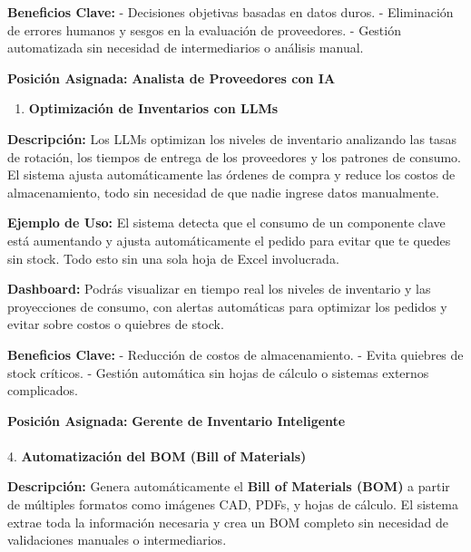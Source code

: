 \documentclass[
  10pt,
  letterpaper,
]{book}
\makeatletter
\let\oldparagraph\paragraph
\renewcommand{\paragraph}{
    \@ifstar
      \xxxParagraphStar
      \xxxParagraphNoStar
  }
\newcommand{\xxxParagraphStar}[1]{\oldparagraph*{#1}\mbox{}}
\newcommand{\xxxParagraphNoStar}[1]{\oldparagraph{#1}\mbox{}}
\providecommand{\tightlist}{%
  \setlength{\itemsep}{0pt}\setlength{\parskip}{0pt}}\usepackage{longtable,booktabs,array}
\makeatother
\begin{document}
\textbf{Beneficios Clave:} - Decisiones objetivas basadas en datos
duros. - Eliminación de errores humanos y sesgos en la evaluación de
proveedores. - Gestión automatizada sin necesidad de intermediarios o
análisis manual.

\textbf{Posición Asignada:} \textbf{Analista de Proveedores con IA}

\begin{enumerate}
\def\labelenumi{\arabic{enumi}.}
\setcounter{enumi}{2}
\tightlist
\item
  \textbf{Optimización de Inventarios con LLMs}
\end{enumerate}

\textbf{Descripción:} Los LLMs optimizan los niveles de inventario
analizando las tasas de rotación, los tiempos de entrega de los
proveedores y los patrones de consumo. El sistema ajusta automáticamente
las órdenes de compra y reduce los costos de almacenamiento, todo sin
necesidad de que nadie ingrese datos manualmente.

\textbf{Ejemplo de Uso:} El sistema detecta que el consumo de un
componente clave está aumentando y ajusta automáticamente el pedido para
evitar que te quedes sin stock. Todo esto sin una sola hoja de Excel
involucrada.

\textbf{Dashboard:} Podrás visualizar en tiempo real los niveles de
inventario y las proyecciones de consumo, con alertas automáticas para
optimizar los pedidos y evitar sobre costos o quiebres de stock.

\textbf{Beneficios Clave:} - Reducción de costos de almacenamiento. -
Evita quiebres de stock críticos. - Gestión automática sin hojas de
cálculo o sistemas externos complicados.

\textbf{Posición Asignada:} \textbf{Gerente de Inventario Inteligente}

\paragraph{\texorpdfstring{4. \textbf{Automatización del BOM (Bill of
Materials)}}{4. Automatización del BOM (Bill of Materials)}}\label{automatizaciuxf3n-del-bom-bill-of-materials}

\textbf{Descripción:} Genera automáticamente el \textbf{Bill of
Materials (BOM)} a partir de múltiples formatos como imágenes CAD, PDFs,
y hojas de cálculo. El sistema extrae toda la información necesaria y
crea un BOM completo sin necesidad de validaciones manuales o
intermediarios.
\end{document}
